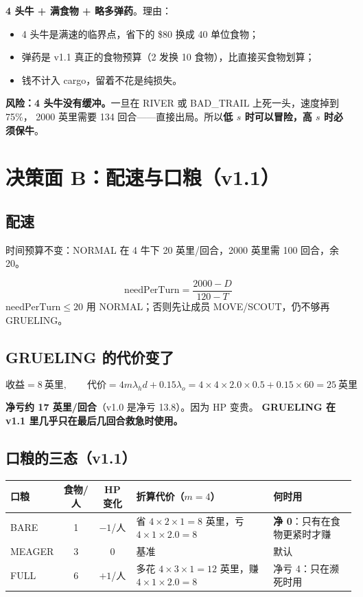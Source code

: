 \documentclass[UTF8,11pt,a4paper]{ctexart}
\begin{document}
\begin{goodbox}[title={建议}]
\textbf{4 头牛 + 满食物 + 略多弹药}。理由：
\begin{itemize}[leftmargin=1.4em]
  \item 4 头牛是满速的临界点，省下的 \$80 换成 40 单位食物；
  \item 弹药是 v1.1 真正的食物预算（2 发换 10 食物），比直接买食物划算；
  \item 钱不计入 cargo，留着不花是纯损失。
\end{itemize}
\textbf{风险：4 头牛没有缓冲。}一旦在 RIVER 或 BAD\_TRAIL 上死一头，速度掉到 75\%，
2000 英里需要 134 回合——直接出局。所以\textbf{低 $s$ 时可以冒险，高 $s$ 时必须保牛}。
\end{goodbox}

\section{决策面 B：配速与口粮（v1.1）}

\subsection{配速}

时间预算不变：NORMAL 在 4 牛下 20 英里/回合，2000 英里需 100 回合，余 20。

\[
\text{needPerTurn}=\frac{2000-D}{120-T}
\]
$\text{needPerTurn}\le20$ 用 NORMAL；否则先让成员 MOVE/SCOUT，仍不够再 GRUELING。

\subsection{GRUELING 的代价变了}

\[
\text{收益}=8\ \text{英里},\qquad
\text{代价}=4m\lambda_h d+0.15\lambda_o=4\times4\times2.0\times0.5+0.15\times60=25\ \text{英里}
\]

\textbf{净亏约 17 英里/回合}（v1.0 是净亏 13.8）。因为 HP 变贵。
\textbf{GRUELING 在 v1.1 里几乎只在最后几回合救急时使用。}

\subsection{口粮的三态（v1.1）}

\begin{center}
\small
\begin{tabular}{@{}lccp{5.0cm}p{4.2cm}@{}}
\toprule
\textbf{口粮} & \textbf{食物/人} & \textbf{HP 变化} & \textbf{折算代价（$m=4$）} & \textbf{何时用} \\
\midrule
BARE & 1 & $-1$/人 & 省 $4\times2\times1=8$ 英里，亏 $4\times1\times2.0=8$ & \textbf{净 0}：只有在食物更紧时才赚 \\
MEAGER & 3 & 0 & 基准 & 默认 \\
FULL & 6 & $+1$/人 & 多花 $4\times3\times1=12$ 英里，赚 $4\times1\times2.0=8$ & 净亏 4：只在濒死时用 \\
\bottomrule
\end{tabular}
\end{center}
\end{document}
